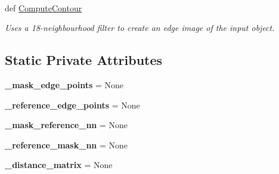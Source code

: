 \paragraph*{}
\begin{DoxyCompactItemize}
\item 
def \hyperlink{classmedpy_1_1metric_1_1Surface_1_1Surface_a7816a65c3be7f869e47a6094e456342e}{ComputeContour}
\begin{DoxyCompactList}\small\item\em Uses a 18-\/neighbourhood filter to create an edge image of the input object. \end{DoxyCompactList}\end{DoxyCompactItemize}

\subsection*{Static Private Attributes}
\begin{DoxyCompactItemize}
\item 
\hypertarget{classmedpy_1_1metric_1_1Surface_1_1Surface_a7cd834bc795768df7564aeda9c3edeb5}{
{\bfseries \_\-mask\_\-edge\_\-points} = None}
\label{classmedpy_1_1metric_1_1Surface_1_1Surface_a7cd834bc795768df7564aeda9c3edeb5}

\item 
\hypertarget{classmedpy_1_1metric_1_1Surface_1_1Surface_a001aa021b5df827302cefa27fc7ac4f7}{
{\bfseries \_\-reference\_\-edge\_\-points} = None}
\label{classmedpy_1_1metric_1_1Surface_1_1Surface_a001aa021b5df827302cefa27fc7ac4f7}

\item 
\hypertarget{classmedpy_1_1metric_1_1Surface_1_1Surface_ad92d57dc8463a356249730f2792287fc}{
{\bfseries \_\-mask\_\-reference\_\-nn} = None}
\label{classmedpy_1_1metric_1_1Surface_1_1Surface_ad92d57dc8463a356249730f2792287fc}

\item 
\hypertarget{classmedpy_1_1metric_1_1Surface_1_1Surface_af73d0a164b13a62d813c512db59df0ea}{
{\bfseries \_\-reference\_\-mask\_\-nn} = None}
\label{classmedpy_1_1metric_1_1Surface_1_1Surface_af73d0a164b13a62d813c512db59df0ea}

\item 
\hypertarget{classmedpy_1_1metric_1_1Surface_1_1Surface_a7826e8c9635b4ea1dc698b6bcfef097c}{
{\bfseries \_\-distance\_\-matrix} = None}
\label{classmedpy_1_1metric_1_1Surface_1_1Surface_a7826e8c9635b4ea1dc698b6bcfef097c}

\end{DoxyCompactItemize}


